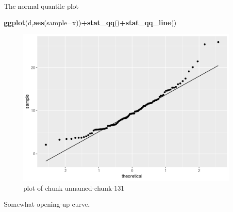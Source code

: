 \documentclass[ignorenonframetext,]{beamer}
\newenvironment{Shaded}{\begin{snugshade}}{\end{snugshade}}
\newcommand{\DataTypeTok}[1]{\textcolor[rgb]{0.13,0.29,0.53}{#1}}
\newcommand{\KeywordTok}[1]{\textcolor[rgb]{0.13,0.29,0.53}{\textbf{#1}}}
\newcommand{\NormalTok}[1]{#1}
\newcommand{\OperatorTok}[1]{\textcolor[rgb]{0.81,0.36,0.00}{\textbf{#1}}}
\begin{document}
\begin{frame}[fragile]{The normal quantile plot}
\protect\hypertarget{the-normal-quantile-plot-3}{}

\begin{Shaded}
\begin{Highlighting}[]
\KeywordTok{ggplot}\NormalTok{(d,}\KeywordTok{aes}\NormalTok{(}\DataTypeTok{sample=}\NormalTok{x))}\OperatorTok{+}\KeywordTok{stat_qq}\NormalTok{()}\OperatorTok{+}\KeywordTok{stat_qq_line}\NormalTok{()}
\end{Highlighting}
\end{Shaded}

\begin{figure}
\centering
\includegraphics{figure/unnamed-chunk-131-1.png}
\caption{plot of chunk unnamed-chunk-131}
\end{figure}

Somewhat opening-up curve.

\end{frame}
\end{document}
